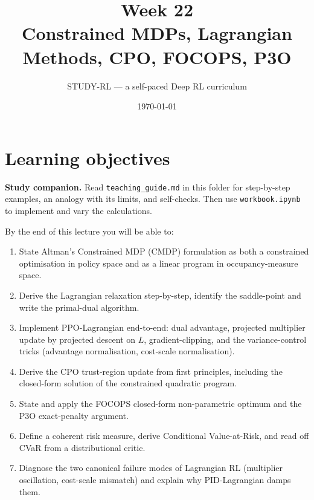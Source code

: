 \documentclass[11pt,oneside]{scrbook}
\title{{\color{rlblue}\textbf{Week 22} \\ \Huge Constrained MDPs, Lagrangian Methods, CPO, FOCOPS, P3O}}
\author{STUDY-RL --- a self-paced Deep RL curriculum}
\date{\today}
\begin{document}
\maketitle
\tableofcontents
\newpage

\chapter*{Learning objectives}


\noindent\textbf{Study companion.} Read \texttt{teaching\_guide.md} in this
folder for step-by-step examples, an analogy with its limits, and self-checks.
Then use \texttt{workbook.ipynb} to implement and vary the calculations.
\par\medskip

\begin{keyidea}
By the end of this lecture you will be able to:
\begin{enumerate}[leftmargin=*]
  \item State Altman's Constrained MDP (CMDP) formulation as both a constrained
        optimisation in policy space and as a linear program in
        occupancy-measure space.
  \item Derive the Lagrangian relaxation step-by-step, identify the saddle-point
        and write the primal-dual algorithm.
  \item Implement PPO-Lagrangian end-to-end: dual advantage, projected
        multiplier update by projected descent on $L$, gradient-clipping, and the variance-control tricks
        (advantage normalisation, cost-scale normalisation).
  \item Derive the CPO trust-region update from first principles, including
        the closed-form solution of the constrained quadratic program.
  \item State and apply the FOCOPS closed-form non-parametric optimum and the
        P3O exact-penalty argument.
  \item Define a coherent risk measure, derive Conditional Value-at-Risk,
        and read off CVaR from a distributional critic.
  \item Diagnose the two canonical failure modes of Lagrangian RL (multiplier
        oscillation, cost-scale mismatch) and explain why PID-Lagrangian
        damps them.
\end{enumerate}
\end{keyidea}
\end{document}
